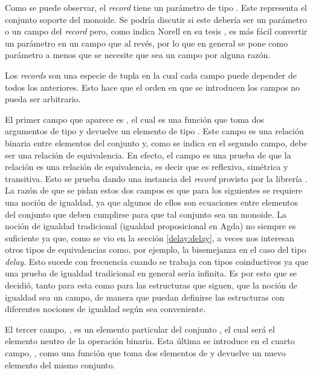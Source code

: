 
Como se puede observar, el \textit{record}  tiene un parámetro  de tipo . Este representa el conjunto soporte del monoide. Se podría discutir si este debería ser un parámetro o un campo del \textit{record} pero, como indica Norell en su tesis \cite{norell:thesis}, es más fácil convertir un parámetro en un campo que al revés, por lo que en general se pone como parámetro a menos que se necesite que sea un campo por alguna razón.

Los \textit{records} son una especie de tupla en la cual cada campo puede depender de todos los anteriores. Esto hace que el orden en que se introducen los campos no pueda ser arbitrario. 

El primer campo que aparece es , el cual es una función que toma dos argumentos de tipo  y devuelve un elemento de tipo . Este campo es una relación binaria entre elementos del conjunto  y, como se indica en el segundo campo, debe ser una relación de equivalencia. En efecto, el campo  es una prueba de que la relación  es una relación de equivalencia, es decir que es reflexiva, simétrica y transitiva. Esto se prueba dando una instancia del \textit{record}  provisto por la librería . La razón de que se pidan estos dos campos es que para los siguientes se requiere una noción de igualdad, ya que algunos de ellos son ecuaciones entre elementos del conjunto  que deben cumplirse para que tal conjunto sea un monoide. La noción de igualdad tradicional (igualdad proposicional en Agda) no siempre es suficiente ya que, como se vio en la sección \ref{delay:delay}, a veces nos interesan otros tipos de equivalencias como, por ejemplo, la bisemejanza en el caso del tipo \textit{delay}. Esto sucede con frecuencia cuando se trabaja con tipos coinductivos ya que una prueba de igualdad tradicional en general sería infinita. Es por esto que se decidió, tanto para esta como para las estructuras que siguen, que la noción de igualdad sea un campo, de manera que puedan definirse las estructuras con diferentes nociones de igualdad según sea conveniente. 

El tercer campo, , es un elemento particular del conjunto , el cual será el elemento neutro de la operación binaria. Esta última se introduce en el cuarto campo, , como una función que toma dos elementos de  y devuelve un nuevo elemento del mismo conjunto. 


